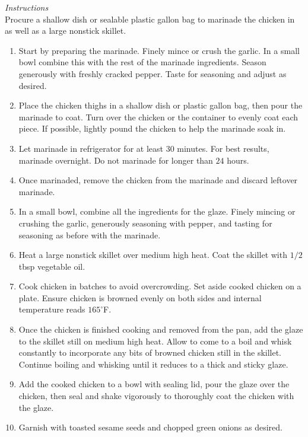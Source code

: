 \documentclass{article}
\newcommand{\instructions}[1][\Large\emph{Instructions}]{%
    \emph{#1}\\}
\newcommand{\temp}[1]{%
    $#1^\circ$F}
\begin{document}
\instructions
Procure a shallow dish or sealable plastic gallon bag to marinade the chicken in as well as a large nonstick skillet.
\begin{enumerate}
    \item Start by preparing the marinade. Finely mince or crush the garlic. In a small bowl combine this with the rest of the marinade ingredients. Season generously with freshly cracked pepper. Taste for seasoning and adjust as desired.
    \item Place the chicken thighs in a shallow dish or plastic gallon bag, then pour the marinade to coat. Turn over the chicken or the container to evenly coat each piece. If possible, lightly pound the chicken to help the marinade soak in.
    \item Let marinade in refrigerator for at least $30$ minutes. For best results, marinade overnight. Do not marinade for longer than $24$ hours.
    \item Once marinaded, remove the chicken from the marinade and discard leftover marinade.
    \item In a small bowl, combine all the ingredients for the glaze. Finely mincing or crushing the garlic, generously seasoning with pepper, and tasting for seasoning as before with the marinade.
    \item Heat a large nonstick skillet over medium high heat. Coat the skillet with $1/2$ tbsp vegetable oil.
    \item Cook chicken in batches to avoid overcrowding. Set aside cooked chicken on a plate. Ensure chicken is browned evenly on both sides and internal temperature reads \temp{165}.
    \item Once the chicken is finished cooking and removed from the pan, add the glaze to the skillet still on medium high heat. Allow to come to a boil and whisk constantly to incorporate any bits of browned chicken still in the skillet. Continue boiling and whisking until it reduces to a thick and sticky glaze.
    \item Add the cooked chicken to a bowl with sealing lid, pour the glaze over the chicken, then seal and shake vigorously to thoroughly coat the chicken with the glaze.
    \item Garnish with toasted sesame seeds and chopped green onions as desired.
\end{enumerate}
\newpage
\end{document}
